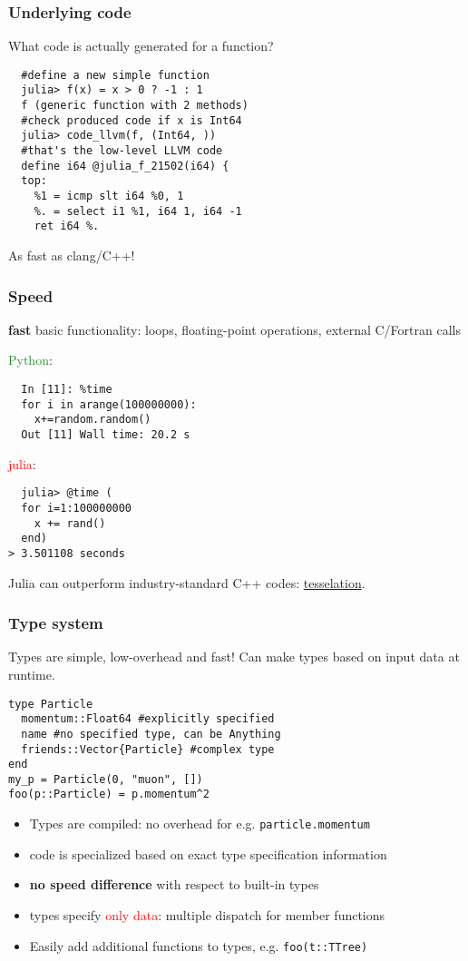 \documentclass[16pt]{beamer}
\begin{document}
\begin{frame}[fragile]
  \frametitle{Underlying code}
  What code is actually generated for a function?
  \begin{lstlisting}
  #define a new simple function
  julia> f(x) = x > 0 ? -1 : 1
  f (generic function with 2 methods)
  #check produced code if x is Int64
  julia> code_llvm(f, (Int64, ))
  #that's the low-level LLVM code
  define i64 @julia_f_21502(i64) {
  top:
    %1 = icmp slt i64 %0, 1
    %. = select i1 %1, i64 1, i64 -1
    ret i64 %.
  \end{lstlisting}
  As fast as clang/C++!
\end{frame}

\begin{frame}[fragile]
\frametitle{Speed}

\begin{center}
\textbf{fast} basic functionality: loops, floating-point operations, external C/Fortran calls
\end{center}

\textcolor{ForestGreen}{Python}:
\begin{lstlisting}
  In [11]: %time
  for i in arange(100000000):
    x+=random.random()
  Out [11] Wall time: 20.2 s
\end{lstlisting}

\textcolor{red}{julia}:
\begin{lstlisting}
  julia> @time (
  for i=1:100000000
    x += rand()
  end)
> 3.501108 seconds
\end{lstlisting}
Julia can outperform industry-standard C++ codes: \href{https://gist.github.com/skariel/3d2018f9341a058e00fc}{tesselation}.
\end{frame}

\begin{frame}[fragile]
\frametitle{Type system}

Types are simple, low-overhead and fast! Can make types based on input data at runtime.
\begin{lstlisting}
type Particle
  momentum::Float64 #explicitly specified
  name #no specified type, can be Anything
  friends::Vector{Particle} #complex type
end
my_p = Particle(0, "muon", [])
foo(p::Particle) = p.momentum^2
\end{lstlisting}

\begin{itemize}
\item Types are compiled: no overhead for e.g. \texttt{particle.momentum}
\item code is  specialized based on exact type specification information
\item \textbf{no speed difference} with respect to built-in types
\item types specify \textcolor{red}{only data}: multiple dispatch for member functions
\item Easily add additional functions to types, e.g. \texttt{foo(t::TTree)}
\end{itemize}

\end{frame}
\end{document}
